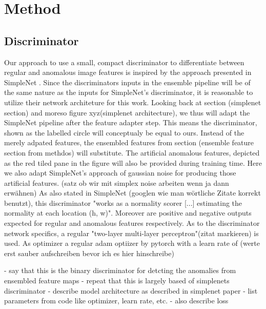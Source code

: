 \chapter{Method}
\label{chap:method}


\section{Discriminator}
Our approach to use a small, compact discriminator to differentiate between regular and anomalous image features is inspired by the approach 
presented in SimpleNet \cite{liu2023simplenet}. Since the discriminators inputs in the ensemble pipeline will be of the same nature as 
the inputs for SimpleNet's discriminator, it is reasonable to utilize their network architeture for this work. Looking back at section 
(simplenet section) and moreso figure xyz(simplenet architecture), we thus will adapt the SimpleNet pipeline after the feature adapter step. 
This means the discriminator, shown as the labelled circle will conceptualy be equal to ours. Instead of the merely adpated features, 
the ensembled features from section (ensemble feature section from methdos) will substitute. The artificial anomalous features, 
depicted as the red tiled pane in the figure will also be provided during training time. Here we also adapt SimpleNet's approach of 
gaussian noise for producing those artificial features. (satz ob wir mit simplex noise arbeiten wenn ja dann erwähnen) As also stated in 
SimpleNet (googlen wie man wörtliche Zitate korrekt benutzt), this discriminator "works as a normality scorer [...] estimating the normality 
at each location (h, w)". Moreover are positive and negative outputs expected for regular and anomalous features respectively.
As to the discriminator network specifics, a regular "two-layer multi-layer perceptron"(zitat markieren) is used. As optimizer a regular 
adam optiizer by pytorch with a learn rate of (werte erst sauber aufschreiben bevor ich es hier hinschreibe)



- say that this is the binary discriminator for detcting the anomalies from ensembled feature maps
- repeat that this is largely based of simplenets discriminator
- describe model architecture as described in simplenet paper
- list parameters from code like optimizer, learn rate, etc.
- also describe loss

